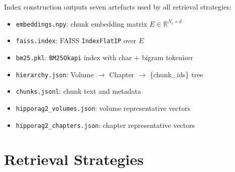 \documentclass[twocolumn]{article}
\begin{document}
Index construction outputs seven artefacts used by all retrieval strategies:

\begin{itemize}
  \item \texttt{embeddings.npy}: chunk embedding matrix $E \in \mathbb{R}^{N_c \times d}$
  \item \texttt{faiss.index}: FAISS \texttt{IndexFlatIP} over $E$
  \item \texttt{bm25.pkl}: \texttt{BM25Okapi} index with char + bigram tokeniser
  \item \texttt{hierarchy.json}: Volume $\to$ Chapter $\to$ \{chunk\_ids\} tree
  \item \texttt{chunks.jsonl}: chunk text and metadata
  \item \texttt{hipporag2\_volumes.json}: volume representative vectors
  \item \texttt{hipporag2\_chapters.json}: chapter representative vectors
\end{itemize}

\section{Retrieval Strategies}
\label{sec:method}
\end{document}
